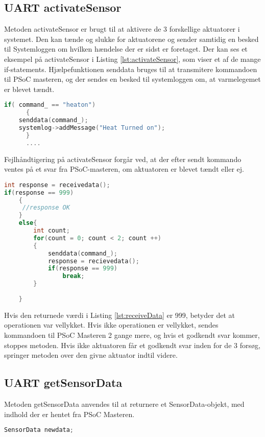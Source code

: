 \subsection{UART activateSensor} 

Metoden activateSensor er brugt til at aktivere de 3 forskellige aktuatorer i systemet. Den kan tænde og slukke for aktuatorene og sender samtidig en besked til Systemloggen om hvilken hændelse der er sidst er foretaget. Der kan ses et eksempel på activateSensor i Listing \ref{lst:activateSensor}, som viser et af de mange if-statements. Hjælpefunktionen senddata bruges til at transmitere kommandoen til PSoC masteren, og der sendes en besked til systemloggen om, at varmelegemet er blevet tændt.

\begin{lstlisting}[language=C ,caption=activateSensor(), label=lst:activateSensor]
 if( command_ == "heaton")
      {
	senddata(command_);
	systemlog->addMessage("Heat Turned on");
      }	 
      ....
\end{lstlisting}

Fejlhåndtigering på activateSensor forgår ved, at der efter sendt kommando ventes på et svar fra PSoC-masteren, om aktuatoren er blevet tændt eller ej. 

\begin{lstlisting}[language=C ,caption=ReceiveData(), label=lst:receiveData]
int response = receivedata();
if(response == 999)
	{
	 //response OK	
	}
	else{
		int count;
		for(count = 0; count < 2; count ++)
		{
			senddata(command_);	
			response = recievedata();
			if(response == 999)
				break;
		}		
		
	}
\end{lstlisting}

Hvis den returnede værdi i Listing \ref{lst:receiveData} er 999, betyder det at operationen var vellykket. Hvis ikke operationen er vellykket, sendes kommandoen til PSoC Masteren 2 gange mere, og hvis et godkendt svar kommer, stoppes metoden. Hvis ikke aktuatoren får et godkendt svar inden for de 3 forsøg, springer metoden over den givne aktuator indtil videre.

\subsection{UART getSensorData} 

Metoden getSensorData anvendes til at returnere et SensorData-objekt, med indhold der er hentet fra PSoC Masteren.

\begin{lstlisting}[language=C ,caption=sensorData(), label=lst:sensorData]
SensorData newdata;
\end{lstlisting} 

